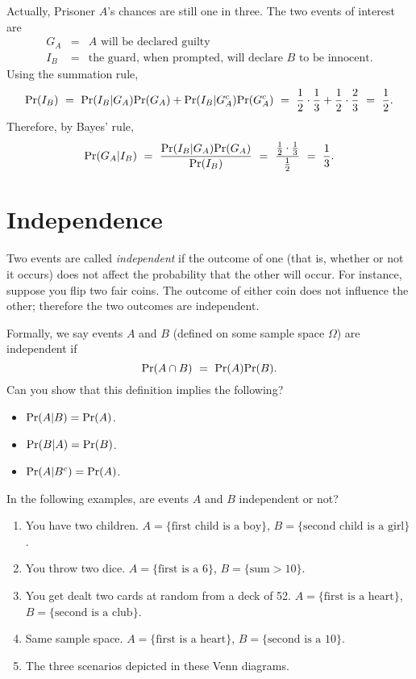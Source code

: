 Actually, Prisoner $A$'s chances are still one in three. The two events of interest are
\begin{eqnarray*}
G_A & = & \mbox{$A$ will be declared guilty} \\
I_B & = & \mbox{the guard, when prompted, will declare $B$ to be innocent} .
\end{eqnarray*}
Using the summation rule,
$$ 
\pr(I_B) 
\ = \ 
\pr(I_B | G_A) \pr(G_A) + \pr(I_B | G_A^c) \pr(G_A^c) 
\ = \ 
\frac{1}{2} \cdot \frac{1}{3} + \frac{1}{2} \cdot \frac{2}{3}
\ = \ 
\frac{1}{2}.
$$
Therefore, by Bayes' rule,
$$
\pr(G_A | I_B) 
\ = \ 
\frac{\pr(I_B | G_A) \pr(G_A)}{\pr(I_B)}
\ = \ 
\frac{\frac{1}{2} \cdot \frac{1}{3}}{\frac{1}{2}}
\ = \ 
\frac{1}{3}
.$$

\section{Independence}

Two events are called {\it independent} if the outcome of one (that is, whether or not it occurs) does not affect the probability that the other will occur. For instance, suppose you flip two fair coins. The outcome of either coin does not influence the other; therefore the two outcomes are independent.

Formally, we say events $A$ and $B$ (defined on some sample space $\Omega$) are independent if
$$ \pr(A \cap B) 
\ = \ 
\pr(A) \pr(B).$$
Can you show that this definition implies the following?
\begin{itemize}
\item $\mbox{\rm Pr}(A | B) = \mbox{\rm Pr}(A)$.
\item $\mbox{\rm Pr}(B | A) = \mbox{\rm Pr}(B)$.
\item $\mbox{\rm Pr}(A | B^c) = \mbox{\rm Pr}(A)$.
\end{itemize}

In the following examples, are events $A$ and $B$ independent or not?
\begin{enumerate}
\item You have two children. $A = \{\mbox{first child is a boy}\}$, $B = \{\mbox{second child is a girl}\}$.
\item You throw two dice. $A = \{\mbox{first is a $6$}\}$, $B = \{\mbox{sum} > 10\}$.
\item You get dealt two cards at random from a deck of 52. $A = \{\mbox{first is a heart}\}$, $B = \{\mbox{second is a club}\}$.
\item Same sample space. $A = \{\mbox{first is a heart}\}$, $B = \{\mbox{second is a $10$}\}$.
\item The three scenarios depicted in these Venn diagrams.
\end{enumerate}


